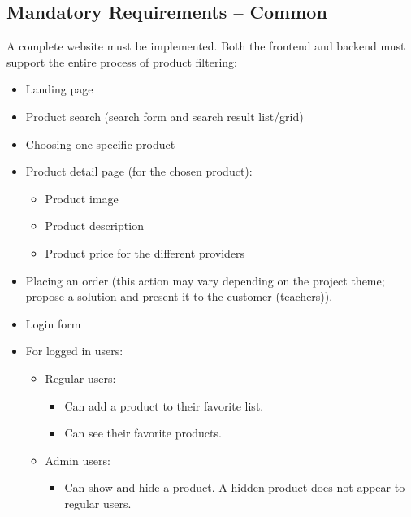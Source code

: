 \documentclass{article}
\begin{document}
\subsection{Mandatory Requirements – Common}
A complete website must be implemented. Both the frontend and backend must support the entire process of product filtering:
\begin{itemize}
    \item Landing page
    \item Product search (search form and search result list/grid)
    \item Choosing one specific product
    \item Product detail page (for the chosen product):
    \begin{itemize}
        \item Product image
        \item Product description
        \item Product price for the different providers
    \end{itemize}
    \item Placing an order (this action may vary depending on the project theme; propose a solution and present it to the customer (teachers)).
    \item Login form
    \item For logged in users:
    \begin{itemize}
        \item Regular users:
        \begin{itemize}
            \item Can add a product to their favorite list.
            \item Can see their favorite products.
        \end{itemize}
        \item Admin users:
        \begin{itemize}
            \item Can show and hide a product. A hidden product does not appear to regular users.
        \end{itemize}
    \end{itemize}
\end{itemize}
\end{document}
